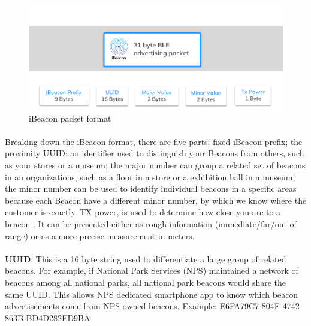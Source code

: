 \documentclass[12pt]{article}
\begin{document}
\begin{figure}[H]
	\centering
	\includegraphics[width=1.0\linewidth]{media/ibeacon-format.jpg}
	\caption{iBeacon packet format}
	\label{fig:translate_uml}
\end{figure} 

\paragraph{}Breaking down the iBeacon format, there are five parts: fixed iBeacon prefix; the proximity UUID: an identifier used to distinguish your Beacons from others, such as your stores or a museum; the major number can group a related set of beacons in an organizations, such as a floor in a store or a exhibition hall in a museum; the minor number can be used to identify individual beacons in a specific areas because each Beacon have a different minor number, by which we know where the customer is exactly. TX power, is used to determine how close you are to a beacon \cite{beacons}. It can be presented either as  rough information (immediate/far/out of range) or as a more precise measurement in meters.
%


\paragraph{} 
\textbf{UUID}: This is a 16 byte string used to differentiate a large group of related beacons. For example, if National Park Services (NPS) maintained a network of beacons among all national parks, all national park beacons would share the same UUID. This allows NPS dedicated smartphone app to know which beacon advertisements come from NPS owned beacons. Example: E6FA79C7-804F-4742-863B-BD4D282ED9BA \\
\end{document}
